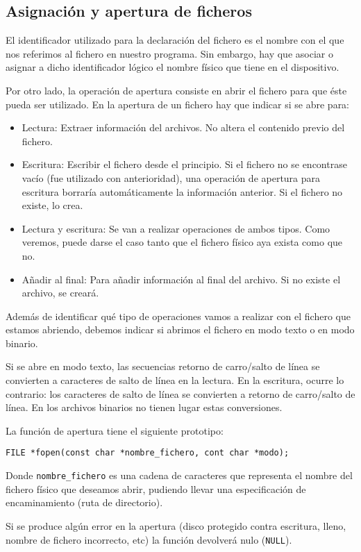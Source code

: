 \subsection{Asignación y apertura de ficheros}{
El identificador utilizado para la declaración del fichero es el nombre con el que nos referimos al fichero en nuestro programa. Sin embargo, hay que asociar o asignar a dicho identificador lógico el nombre físico que tiene en el dispositivo.

Por otro lado, la operación de apertura consiste en abrir el fichero para que éste pueda ser utilizado. En la apertura de un fichero hay que indicar si se abre para:
\begin{itemize}
	\item Lectura: Extraer información del archivos. No altera el contenido previo del fichero.
	\item Escritura: Escribir el fichero desde el principio. Si el fichero no se encontrase vacío (fue utilizado con anterioridad), una operación de apertura para escritura borraría automáticamente la información anterior. Si el fichero no existe, lo crea.
	\item Lectura y escritura: Se van a realizar operaciones de ambos tipos. Como veremos, puede darse el caso tanto que el fichero físico aya exista como que no.
	\item Añadir al final: Para añadir información al final del archivo. Si no existe el archivo, se creará.
\end{itemize}
Además de identificar qué tipo de operaciones vamos a realizar con el fichero que estamos abriendo, debemos indicar si abrimos el fichero en modo texto o en modo binario.

Si se abre en modo texto, las secuencias retorno de carro/salto de línea se convierten a caracteres de salto de línea en la lectura. En la escritura, ocurre lo contrario: los caracteres de salto de línea se convierten a retorno de carro/salto de línea. En los archivos binarios no tienen lugar estas conversiones.

La función de apertura tiene el siguiente prototipo:

\texttt{FILE *fopen(const char *nombre\_fichero, cont char *modo);}

Donde \texttt{nombre\_fichero} es una cadena de caracteres que representa el nombre del fichero físico que deseamos abrir, pudiendo llevar una especificación de encaminamiento (ruta de directorio).

Si se produce algún error en la apertura (disco protegido contra escritura, lleno, nombre de fichero incorrecto, etc) la función devolverá nulo (\texttt{NULL}).

}

